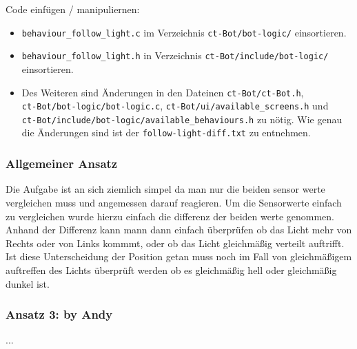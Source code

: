 Code einfügen / manipuliernen:
\begin{itemize}
    \item \verb+behaviour_follow_light.c+  im Verzeichnis 
        \verb+ct-Bot/bot-logic/+ einsortieren.
    \item \verb+behaviour_follow_light.h+ in Verzeichnis
        \verb+ct-Bot/include/bot-logic/+ einsortieren.
    \item Des Weiteren sind Änderungen in den Dateinen \verb+ct-Bot/ct-Bot.h+, \\
        \verb+ct-Bot/bot-logic/bot-logic.c+,
        \verb+ct-Bot/ui/available_screens.h+ und \\
        \verb+ct-Bot/include/bot-logic/available_behaviours.h+ zu nötig.
        Wie genau die Änderungen sind ist der \verb+follow-light-diff.txt+ zu entnehmen.
\end{itemize}

\subsubsection{Allgemeiner Ansatz}

Die Aufgabe ist an sich ziemlich simpel da man nur die beiden sensor werte vergleichen muss und angemessen darauf reagieren.
Um die Sensorwerte einfach zu vergleichen wurde hierzu einfach die differenz der beiden werte genommen.
Anhand der Differenz kann mann dann einfach überprüfen ob das Licht mehr von Rechts oder von Links kommmt, oder ob das Licht gleichmäßig verteilt auftrifft.
Ist diese Unterscheidung der Position getan muss noch im Fall von gleichmäßigem auftreffen des Lichts überprüft werden ob es gleichmäßig hell oder gleichmäßig dunkel ist.



\subsubsection{Ansatz 3: by Andy}
...
